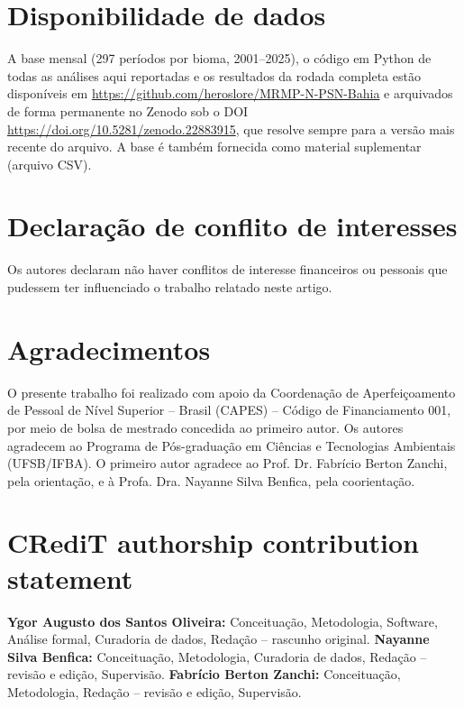 \documentclass[a4paper,fleqn]{cas-sc}
\begin{document}
\section*{Disponibilidade de dados}
A base mensal (297 períodos por bioma, 2001--2025), o código em Python de todas as análises aqui reportadas e os resultados da rodada completa estão disponíveis em \url{https://github.com/heroslore/MRMP-N-PSN-Bahia} e arquivados de forma permanente no Zenodo sob o DOI \url{https://doi.org/10.5281/zenodo.22883915}, que resolve sempre para a versão mais recente do arquivo. A base é também fornecida como material suplementar (arquivo CSV).

\section*{Declaração de conflito de interesses}
Os autores declaram não haver conflitos de interesse financeiros ou pessoais que pudessem ter influenciado o trabalho relatado neste artigo.

\section*{Agradecimentos}
O presente trabalho foi realizado com apoio da Coordenação de Aperfeiçoamento de Pessoal de Nível Superior -- Brasil (CAPES) -- Código de Financiamento 001, por meio de bolsa de mestrado concedida ao primeiro autor. Os autores agradecem ao Programa de Pós-graduação em Ciências e Tecnologias Ambientais (UFSB/IFBA). O primeiro autor agradece ao Prof. Dr. Fabrício Berton Zanchi, pela orientação, e à Profa. Dra. Nayanne Silva Benfica, pela coorientação.

\section*{CRediT authorship contribution statement}
\textbf{Ygor Augusto dos Santos Oliveira:} Conceituação, Metodologia, Software, Análise formal, Curadoria de dados, Redação -- rascunho original. \textbf{Nayanne Silva Benfica:} Conceituação, Metodologia, Curadoria de dados, Redação -- revisão e edição, Supervisão. \textbf{Fabrício Berton Zanchi:} Conceituação, Metodologia, Redação -- revisão e edição, Supervisão.



\end{document}
